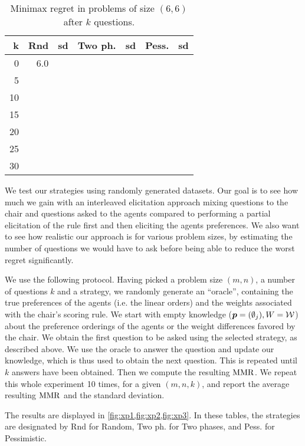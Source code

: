 \begin{table}
	\begin{center}
		\begin{tabular}{rr@{ ± }lr@{ ± }lr@{ ± }l}
			\toprule
			k & Rnd & sd & Two ph. & sd & Pess. & sd \\
			\midrule
			0 & 6.0 &  &  &  &  & \\
			5 &  &  &  &  &  & \\
			10 &  &  &  &  &  & \\
			15 &  &  &  &  &  & \\
			20 &  &  &  &  &  & \\
			25 &  &  &  &  &  &  \\
			30 &  &  &  &  &  & \\
			\bottomrule
		\end{tabular}
	\end{center}
	\caption{Minimax regret in problems of size $(6, 6)$ after $k$ questions.}
	\label{fig:xp3}
\end{table}

We test our strategies using randomly generated datasets. %
Our goal is to see how much we gain with an interleaved elicitation approach mixing questions to the chair and questions asked to the agents compared to performing a partial elicitation of the rule first and then eliciting the agents preferences. We also want to see how realistic our approach is for various problem sizes, by estimating the number of questions we would have to ask before being able to reduce the worst regret significantly.

We use the following protocol.
Having picked a problem size $(m, n)$, a number of questions $k$ and a strategy, we randomly generate an “oracle”, containing the true preferences of the agents (i.e. the linear orders) and the weights associated with the chair's scoring rule. We start with empty knowledge (${\bm{p}} = (\emptyset_j), W = \mathcal{W}$) about the preference orderings of the agents or the weight differences favored by the chair. We obtain the first question to be asked using the selected strategy, as described above. We use the oracle to answer the question and update our knowledge, which is thus used to obtain the next question. This is repeated until $k$ answers have been obtained. Then we compute the resulting $\operatorname{MMR}$. We repeat this whole experiment 10 times, for a given $(m, n, k)$, and report the average resulting $\operatorname{MMR}$ and the standard deviation.

The results are displayed in \cref{fig:xp1,fig:xp2,fig:xp3}. In these tables, the strategies are designated by Rnd for Random, Two ph. for Two phases, and Pess. for Pessimistic. 

